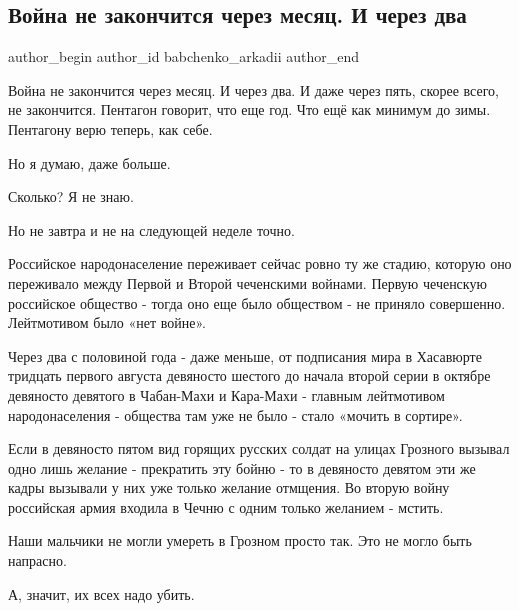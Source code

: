  
 
 
 
 
 
\subsection{Война не закончится через месяц. И через два}
\label{sec:22_04_2022.fb.babchenko_arkadii.1.vojna_ne_zakonchitsja}
 
\ifcmt
 author_begin
   author_id babchenko_arkadii
 author_end
\fi

Война не закончится через месяц. И через два. И даже через пять, скорее всего,
не закончится. Пентагон говорит, что еще год. Что ещё как минимум до зимы.
Пентагону верю теперь, как себе. 

Но я думаю, даже больше. 


Сколько? Я не знаю. 

Но не завтра и не на следующей неделе точно. 

Российское народонаселение переживает сейчас ровно ту же стадию, которую оно
переживало между Первой и Второй чеченскими войнами. Первую чеченскую
российское общество - тогда оно еще было обществом - не приняло совершенно.
Лейтмотивом было «нет войне». 

Через два с половиной года - даже меньше, от подписания мира в Хасавюрте
тридцать первого августа девяносто шестого до начала второй серии в октябре
девяносто девятого в Чабан-Махи и Кара-Махи - главным лейтмотивом
народонаселения - общества там уже не было - стало «мочить в сортире». 

Если в девяносто пятом вид горящих русских солдат на улицах Грозного вызывал
одно лишь желание - прекратить эту бойню - то в девяносто девятом эти же кадры
вызывали у них уже только желание отмщения. Во вторую войну российская армия
входила в Чечню с одним только желанием - мстить. 

Наши мальчики не могли умереть в Грозном просто так. Это не могло быть
напрасно. 

А, значит, их всех надо убить. 

